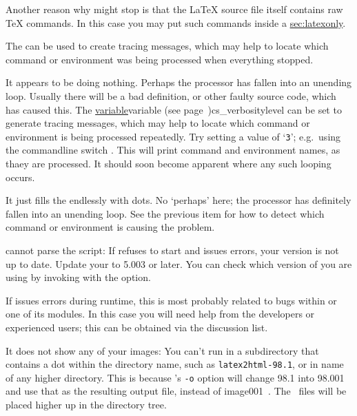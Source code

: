 \begin{htmllist}
Another reason why \latextohtml{} might stop is that the \LaTeX{} source
file itself contains raw \TeX{} commands. In this case you may 
put such commands inside a 
\hyperref{environment}{environment (see Section }{)}{sec:latexonly}.

The   can be used 
to create tracing messages, which may help to locate which command 
or environment was being processed when everything stopped.

\item [It appears to be doing nothing.\label{looping}]
Perhaps the processor has fallen into an unending loop.
Usually there will be a bad definition, or other faulty source code,
which has caused this.
The  \hyperref[page]{variable}{variable (see page~}{)}{cs_verbositylevel}%
can be set to generate tracing messages, which may help to locate which command 
or environment is being processed repeatedly.
Try setting a value of `\texttt{3}'; e.g.\ using the commandline switch .
This will print command and environment names, as thaey are processed.
It should soon become apparent where any such looping occurs.

\item [It just fills the endlessly with dots.]
No `perhaps' here; the processor has definitely fallen into an unending loop.
See the previous item for how to detect which command or environment
is causing the problem.

\item [\Perl{} cannot parse the \fn{latex2html} script: ]
If \Perl{} refuses to start \latextohtml{} and issues errors, your
\Perl{} version is not up to date.
Update your \Perl{} to 5.003 or later. You can check which version of
\Perl{} you are using by invoking \Perl{} with the  option.

If \Perl{} issues errors during runtime, this is most probably related
to bugs within \latextohtml{} or one of its modules.
In this case you will need help from the developers or experienced users;
this can be obtained via the discussion list.


\item [It does not show any of your images: ]
  You can't run \latextohtml{} in a subdirectory that contains a dot
  within the directory name, such as {\tt latex2html-98.1},
  or in name of any higher directory.
  This is because 's \texttt{-o} option will change 98.1 into 98.001
  and use that as the resulting output file, instead of image001~.
  The \PS\ files will be placed higher up in the directory tree.


\end{htmllist}
